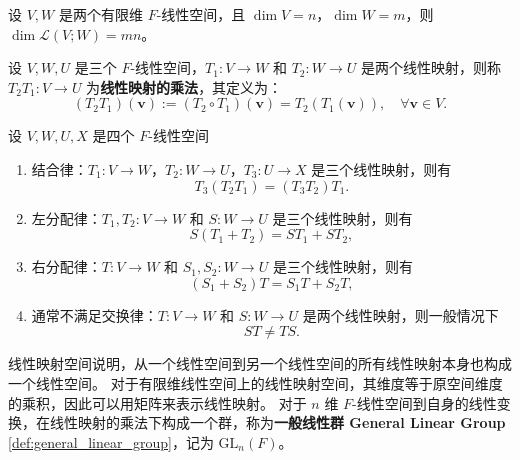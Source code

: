 \begin{proposition}[有限维线性映射空间的维度]
    设 $V,W$ 是两个有限维 $F$-线性空间，且 $\dim V = n$，$\dim W = m$，则 $\dim \mathcal{L}(V;W) = mn$。
    \label{prop:finite_dimensional_linear_map_space_dimension}
\end{proposition}

\begin{definition}[线性映射的乘法]
    设 $V,W,U$ 是三个 $F$-线性空间，$T_1:V\to W$ 和 $T_2:W\to U$ 是两个线性映射，则称 $T_2 T_1:V\to U$ 为\textbf{线性映射的乘法}，其定义为：
    \[
        (T_2 T_1)(\mathbf{v}) := (T_2 \circ T_1)(\mathbf{v}) = T_2(T_1(\mathbf{v})), \quad \forall \mathbf{v}\in V.
    \]
\end{definition}

\begin{proposition}[线性映射乘法的性质]
    设 $V,W,U,X$ 是四个 $F$-线性空间
    \begin{enumerate}
        \item 结合律：$T_1:V\to W$，$T_2:W\to U$，$T_3:U\to X$ 是三个线性映射，则有
        \[
            T_3(T_2 T_1) = (T_3 T_2) T_1.
        \]
        \item 左分配律：$T_1,T_2:V\to W$ 和 $S:W\to U$ 是三个线性映射，则有
        \[
            S(T_1 + T_2) = S T_1 + S T_2,
        \]
        \item 右分配律：$T:V\to W$ 和 $S_1,S_2:W\to U$ 是三个线性映射，则有
        \[
            (S_1 + S_2) T = S_1 T + S_2 T,
        \]
        \item 通常不满足交换律：$T:V\to W$ 和 $S:W\to U$ 是两个线性映射，则一般情况下
        \[
            ST \neq TS.
        \]
    \end{enumerate}
\end{proposition}

\begin{note}
    线性映射空间说明，从一个线性空间到另一个线性空间的所有线性映射本身也构成一个线性空间。
    对于有限维线性空间上的线性映射空间，其维度等于原空间维度的乘积，因此可以用矩阵来表示线性映射。
    对于 $n$ 维 $F$-线性空间到自身的线性变换，在线性映射的乘法下构成一个群，称为\textbf{一般线性群 General Linear Group} \ref{def:general_linear_group}，记为 $\mathrm{GL}_n(F)$。
\end{note}

\vspace{1em}


\newpage